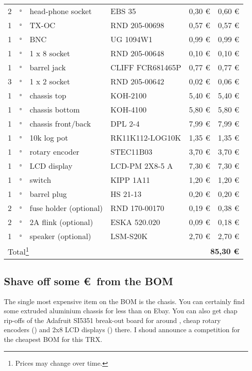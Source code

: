 \documentclass[10pt, a4paper]{scrartcl}
\begin{document}
\begin{longtable}{|p{}|p{}|p{}|p{}|p{}|p{}|}
2 & $\square$ & head-phone socket & EBS 35 & 0,30 \euro & 0,60 \euro\\
1 & $\square$ & TX-OC & RND 205-00698 & 0,57 \euro & 0,57 \euro \\
1 & $\square$ & BNC & UG 1094W1 & 0,99 \euro & 0,99 \euro \\
1 & $\square$ & 1 x 8 socket & RND 205-00648 & 0,10 \euro & 0,10 \euro \\
1 & $\square$ & barrel jack & CLIFF FCR681465P & 0,77 \euro & 0,77 \euro \\
3 & $\square$ & 1 x 2 socket & RND 205-00642 & 0,02 \euro & 0,06 \euro \\ \hline
1 & $\square$ & chassis top & KOH-2100 & 5,40 \euro & 5,40 \euro \\
1 & $\square$ & chassis bottom & KOH-4100 & 5,80 \euro & 5,80 \euro \\
1 & $\square$ & chassis front/back & DPL 2-4 & 7,99 \euro & 7,99 \euro \\
1 & $\square$ & 10k log pot & RK11K112-LOG10K & 1,35 \euro & 1,35 \euro \\
1 & $\square$ & rotary encoder & STEC11B03 & 3,70 \euro & 3,70 \euro \\
1 & $\square$ & LCD display & LCD-PM 2X8-5 A & 7,30 \euro & 7,30 \euro \\
1 & $\square$ & switch & KIPP 1A11 & 1,20 \euro & 1,20 \euro \\
1 & $\square$ & barrel plug & HS 21-13 & 0,20 \euro & 0,20 \euro \\
2 & $\square$ & fuse holder (optional) & RND 170-00170 & 0,19 \euro & 0,38 \euro \\
2 & $\square$ & 2A flink (optional) & ESKA 520.020 & 0,09 \euro & 0,18 \euro \\
1 & $\square$ & speaker (optional) & LSM-S20K & 2,70 \euro & 2,70 \euro \\ \hline \hline
\multicolumn{4}{|l}{Total\footnote{Prices may change over time.}} & \multicolumn{2}{r|}{\textbf{85,30 \euro}} \\ \hline
\end{longtable}

\subsection{Shave off some \euro\ from the BOM}
The single most expensive item on the BOM is the chasis. You can certainly find some extruded aluminium chassis for less than  on Ebay. You can also get chap rip-offs of the Adafruit SI5351 break-out board for around , cheap rotary encoders () and 2x8 LCD displays () there. I shoud announce a competition for the cheapest BOM for this TRX.
\end{document}
